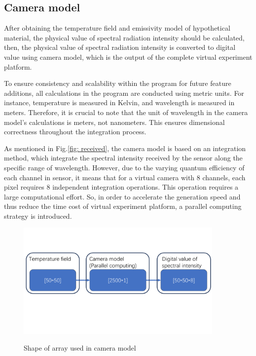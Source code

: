 \subsection{Camera model}
After obtaining the temperature field and emissivity model of hypothetical material, 
the physical value of spectral radiation intensity should be calculated, then, 
the physical value of spectral radiation intensity is converted to 
digital value using camera model, which is the output of the complete virtual 
experiment platform. 


To ensure consistency and scalability within the program for future feature 
additions, all calculations in the program are conducted using metric units. 
For instance, temperature is measured in Kelvin, and wavelength is measured in 
meters. Therefore, it is crucial to note that the unit of wavelength in the camera 
model's calculations is meters, not nanometers. This ensures dimensional 
correctness throughout the integration process.


As mentioned in Fig.\ref{fig: received}, the camera model is based on an integration 
method, which integrate the spectral intensity received by the sensor along the 
specific range of wavelength. However, due to the varying quantum 
efficiency of each channel in sensor, it means that for a virtual camera 
with 8 channels, each pixel requires 8 independent integration operations. 
This operation requires a large computational effort. So, in order to 
accelerate the generation speed and thus reduce the time cost of virtual 
experiment platform, a parallel computing strategy is introduced.


\begin{figure}[htbp]
  \centering
  \includegraphics[width=0.9\textwidth]{figures/reshape.pdf}
  \label{fig: reshape}
  \caption{Shape of array used in camera model}
\end{figure}



